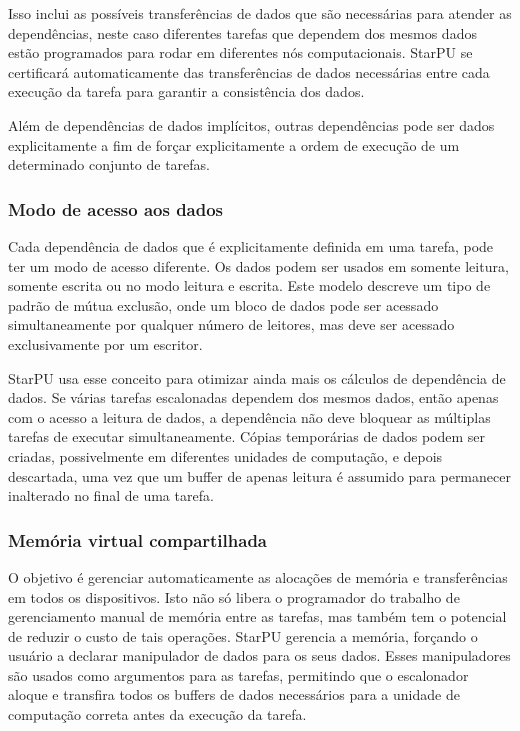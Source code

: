 Isso inclui as possíveis transferências de dados que são necessárias para atender as dependências, neste caso diferentes tarefas que dependem dos mesmos dados estão programados para rodar em diferentes nós computacionais. StarPU se certificará automaticamente das transferências de dados necessárias entre cada execução da tarefa para garantir a consistência dos dados. 

Além de dependências de dados implícitos, outras dependências pode ser dados explicitamente a fim de forçar explicitamente a ordem de execução de um determinado conjunto de tarefas.


\subsubsection{Modo de acesso aos dados}

Cada dependência de dados que é explicitamente definida em uma tarefa, pode ter um modo de acesso diferente. Os dados podem ser usados em somente leitura, somente escrita ou no modo leitura e escrita. Este modelo descreve um tipo de padrão de mútua exclusão, onde um bloco de dados pode ser acessado simultaneamente por qualquer número de leitores, mas deve ser acessado exclusivamente por um escritor. 

StarPU usa esse conceito para otimizar ainda mais os cálculos de dependência de dados. Se várias tarefas escalonadas dependem dos mesmos dados, então apenas com o acesso a leitura de dados, a dependência não deve bloquear as múltiplas tarefas de executar simultaneamente. Cópias temporárias de dados podem ser criadas, possivelmente em diferentes unidades de computação, e depois descartada, uma vez que um buffer de apenas leitura é assumido para permanecer inalterado no final de uma tarefa.

\subsubsection{Memória virtual compartilhada}

O objetivo é gerenciar automaticamente as alocações de memória e transferências em todos os dispositivos. Isto não só libera o programador do trabalho de gerenciamento manual de memória entre as tarefas, mas também tem o potencial de reduzir o custo de tais operações. StarPU gerencia a memória, forçando o usuário a declarar manipulador de dados para os seus dados. Esses manipuladores são usados como argumentos para as tarefas, permitindo que o escalonador aloque e transfira todos os buffers de dados necessários para a unidade de computação correta antes da execução da tarefa.



